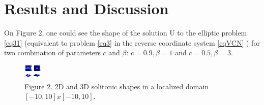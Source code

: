 \documentclass[12pt]{article}
\theoremstyle{theorem}
\theoremstyle{defi}
\begin{document}
\section{Results and Discussion}

On Figure 2, one could see the shape of the solution U to the elliptic problem  \eqref{eq31} (equivalent to problem \eqref{eq3} in the reverse coordinate system \eqref{eqVCN}  ) for two combination of parameters $c$ and $\beta$:
$c = 0.9, \beta = 1$ and $c = 0.5, \beta = 3$.

\begin{figure}[htbp]
        \centering
              \includegraphics[width=0.98\linewidth]{figure2.eps}   
        \caption{Figure 2. 2D and 3D solitonic shapes in a localized domain  $[-10, 10] x [-10, 10]$.}
	\label{fig2}
\end{figure}

\end{document}
